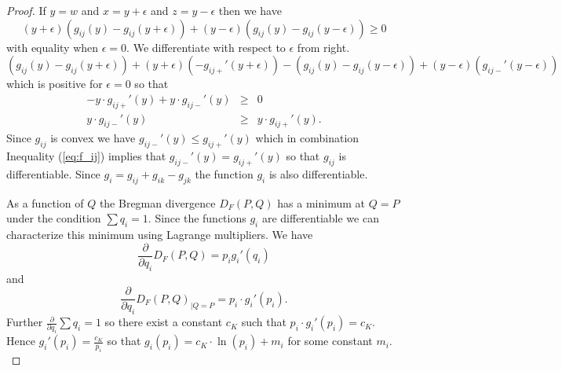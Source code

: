 \documentclass[10pt,a4paper,draft]{article}
\begin{document}
\begin{proof}
If $y=w$ and $x=y+\epsilon$ and $z=y-\epsilon$ then
we have
\[
\left(y+\epsilon\right)\left(g_{ij}\left(y\right)-g_{ij}\left(y+\epsilon\right)\right)+\left(y-\epsilon\right)\left(g_{ij}\left(y\right)-g_{ij}\left(y-\epsilon\right)\right)\geq0
\]
with equality when $\epsilon=0.$ We differentiate with respect
to
$\epsilon$ from right. 
\[
\left(g_{ij}\left(y\right)-g_{ij}\left(y+\epsilon\right)\right)+\left(y+\epsilon\right)\left(-g_{ij+}'\left(y+\epsilon\right)\right)-\left(g_{ij}\left(y\right)-g_{ij}\left(y-\epsilon\right)\right)+\left(y-\epsilon\right)\left(g_{ij-}'\left(y-\epsilon\right)\right)
\]
 which is positive for $\epsilon=0$ so that 
\begin{eqnarray}
-y\cdot g_{ij+}'\left(y\right)+y\cdot g_{ij-}'\left(y\right) &
\geq & 0\\
y\cdot g_{ij-}'\left(y\right) & \geq & y\cdot
g_{ij+}'\left(y\right).\label{eq:f_ij}
\end{eqnarray}
Since $g_{ij}$ is convex we have $g_{ij-}'\left(y\right)\leq
g_{ij+}'\left(y\right)$
which in combination Inequality (\ref{eq:f_ij}) implies that
$g_{ij-}'\left(y\right)=g_{ij+}'\left(y\right)$
so that $g_{ij}$ is differentiable. Since
$g_{i}=g_{ij}+g_{ik}-g_{jk}$
the function $g_{i}$ is also differentiable. 

As a function of $Q$ the Bregman divergence $D_{F}(P,Q)$ has a
minimum at $Q=P$ under the condition $\sum q_i =1$. Since the
functions $g_i$ are
differentiable we can characterize this minimum using Lagrange
multipliers. We have
\[
\frac{\partial}{\partial
q_{i}}D_{F}\left(P,Q\right)=p_{i}g_{i}'\left(q_{i}\right)
\]
 and 
\[
\frac{\partial}{\partial q_{i}}D_{F}\left(P,Q\right)_{\mid
Q=P}=p_{i}\cdot g_{i}'\left(p_{i}\right).
\]
Further $\frac{\partial}{\partial q_i}\sum q_i =1$ so there
exist a constant $c_{K}$ such that $p_{i}\cdot
g_{i}'\left(p_{i}\right)=c_{K}.$
Hence $g_{i}'\left(p_{i}\right)=\frac{c_{K}}{p_{i}}$ so that
$g_{i}\left(p_{i}\right)=c_{K}\cdot\ln\left(p_{i}\right)+m_{i}$
for some constant $m_{i}.$ 


\end{proof}
\end{document}
